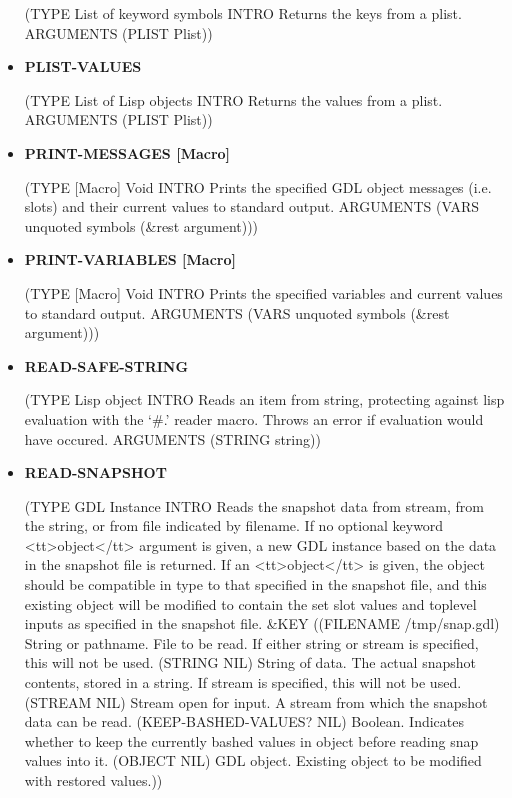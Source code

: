 \documentclass [11pt]{book}
\begin{document}
\begin{itemize}
(TYPE List of keyword symbols INTRO  Returns the keys from a plist.
 ARGUMENTS (PLIST Plist))



\item {}
\label{prim:plist-values}
\textbf{PLIST-VALUES}

(TYPE List of Lisp objects INTRO  Returns the values from a plist.
 ARGUMENTS (PLIST Plist))



\item {}
\label{prim:print-messages}
\textbf{PRINT-MESSAGES [Macro]}

(TYPE [Macro] Void INTRO  Prints the specified GDL object messages (i.e. slots) and their current values to standard output.
 ARGUMENTS (VARS unquoted symbols (\&rest argument)))



\item {}
\label{prim:print-variables}
\textbf{PRINT-VARIABLES [Macro]}

(TYPE [Macro] Void INTRO  Prints the specified variables and current values to standard output.
 ARGUMENTS (VARS unquoted symbols (\&rest argument)))



\item {}
\label{prim:read-safe-string}
\textbf{READ-SAFE-STRING}

(TYPE Lisp object INTRO  Reads an item from string, protecting against lisp evaluation with
the `\#.' reader macro. Throws an error if evaluation would have occured.
 ARGUMENTS (STRING string))



\item {}
\label{prim:read-snapshot}
\textbf{READ-SNAPSHOT}

(TYPE GDL Instance INTRO  Reads the snapshot data from stream, from the string,
or from file indicated by filename. If no optional keyword
<tt>object</tt> argument is given, a new GDL instance based on the
data in the snapshot file is returned. If an <tt>object</tt> is given,
the object should be compatible in type to that specified in the
snapshot file, and this existing object will be modified to contain
the set slot values and toplevel inputs as specified in the snapshot
file.
 \&KEY ((FILENAME /tmp/snap.gdl) String or pathname. File to be read. If either string or stream is specified, this will not be used. (STRING NIL) String of data. The actual snapshot contents, stored in a string. If stream is specified, this will not be used. (STREAM NIL) Stream open for input. A stream from which the snapshot data can be read. (KEEP-BASHED-VALUES? NIL) Boolean. Indicates whether to keep the currently bashed values in object before reading snap values into it. (OBJECT NIL) GDL object. Existing object to be modified with restored values.))




\end{itemize}
\end{document}
